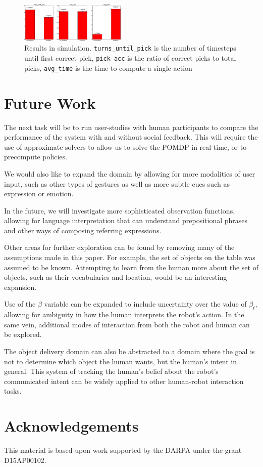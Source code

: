 \documentclass[conference]{IEEEtran}
\begin{document}
\begin{figure}[H]
\begin{center}
	\includegraphics[width=0.45\textwidth]{resources/results}
\end{center}
\caption{Results in simulation. \texttt{turns\_until\_pick} is the number of timesteps until first correct pick,  \texttt{pick\_acc} is the ratio of correct picks to total picks, \texttt{avg\_time} is the time to compute a single action}
	\label{fig:toyresults}
\end{figure}


\section{Future Work}

The next task will be to run user-studies with human participants to compare the performance of the system with and without social feedback. This will require the use of approximate solvers to allow us to solve the POMDP in real time, or to precompute policies. 

We would also like to expand the domain by allowing for more modalities of user input, such as other types of gestures as well as more subtle cues such as expression or emotion. 

In the future, we will investigate more sophisticated observation functions, allowing for language interpretation that can understand prepositional phrases and other ways of composing referring expressions. 

Other areas for further exploration can be found by removing many of the assumptions made in this paper. For example, the set of objects on the table was assumed to be known. Attempting to learn from the human more about the set of objects, such as their vocabularies and location, would be an interesting expansion. 

Use of the $\beta$ variable can be expanded to include uncertainty over the value of $\beta_t$, allowing for ambiguity in how the human interprets the robot's action. In the same vein, additional modes of interaction from both the robot and human can be explored. 

The object delivery domain can also be abstracted to a domain where the goal is not to determine which object the human wants, but the human's intent in general. This system of tracking the human's belief about the robot's communicated intent can be widely applied to other human-robot interaction tasks. 



\section{Acknowledgements}

This material is based upon work supported by the  DARPA under the grant D15AP00102.



\end{document}
